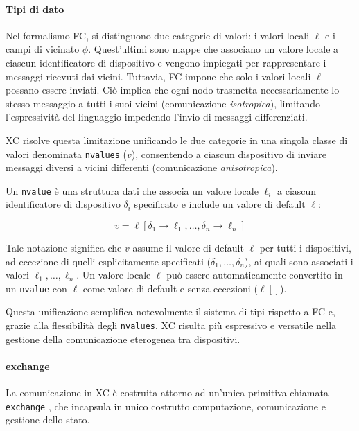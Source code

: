 \paragraph{Tipi di dato} Nel formalismo \ac{FC}, si distinguono due categorie di valori: i valori locali \(\ell\) e i campi di vicinato \(\phi\). Quest'ultimi sono mappe che associano un valore locale a ciascun identificatore di dispositivo e vengono impiegati per rappresentare i messaggi ricevuti dai vicini. Tuttavia, \ac{FC} impone che solo i valori locali \(\ell\) possano essere inviati. Ciò implica che ogni nodo trasmetta necessariamente lo stesso messaggio a tutti i suoi vicini (comunicazione \textit{isotropica}), limitando l'espressività del linguaggio impedendo l'invio di messaggi differenziati.

\ac{XC} risolve questa limitazione unificando le due categorie in una singola classe di valori denominata \texttt{nvalues} (\(v\)), consentendo a ciascun dispositivo di inviare messaggi diversi a vicini differenti (comunicazione \textit{anisotropica}).

Un \texttt{nvalue} è una struttura dati che associa un valore locale \(\ell_i\) a ciascun identificatore di dispositivo \(\delta_i\) specificato e include un valore di default \(\ell\):

\[v = \ell[\delta_1 \to \ell_1, \dots, \delta_n \to \ell_n]\]

Tale notazione significa che \(v\) assume il valore di default \(\ell\) per tutti i dispositivi, ad eccezione di quelli esplicitamente specificati (\(\delta_1, \dots, \delta_n\)), ai quali sono associati i valori \(\ell_1, \dots, \ell_n\). Un valore locale \(\ell\) può essere automaticamente convertito in un \texttt{nvalue} con \(\ell\) come valore di default e senza eccezioni (\(\ell[]\)).

Questa unificazione semplifica notevolmente il sistema di tipi rispetto a \ac{FC} e, grazie alla flessibilità degli \texttt{nvalues}, \ac{XC} risulta più espressivo e versatile nella gestione della comunicazione eterogenea tra dispositivi.

\paragraph{exchange} La comunicazione in \ac{XC} è costruita attorno ad un'unica primitiva chiamata \texttt{exchange} \cite{XC}, che incapsula in unico costrutto computazione, comunicazione e gestione dello stato.

